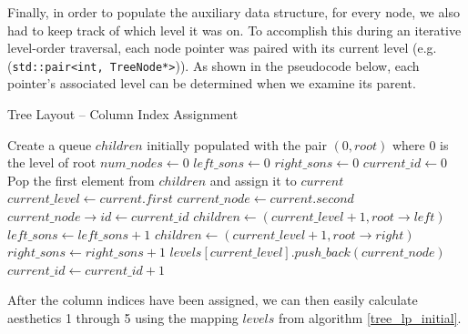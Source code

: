 \documentclass[11pt]{report}
\begin{document}
\bigskip

Finally, in order to populate the auxiliary data structure, for every node, we also had to keep track of which level it was on. To accomplish this during an iterative level-order traversal, each node pointer was paired with its current level (e.g. (\lstinline{std::pair<int, TreeNode*>})). As shown in the pseudocode below, each pointer's associated level can be determined when we examine its parent.

\begin{algorithm}[H]
    \caption{Tree Layout -- Column Index Assignment}
    \label{tree_lp_initial}
    \begin{algorithmic}[1]
        \State Create a queue $children$ initially populated with the pair $(0, root)$ where 0 is the level of root
        \State $num\_nodes \gets 0$ 
        \State $left\_sons \gets 0$
        \State $right\_sons \gets 0$
        \State $current\_id \gets 0$ 
         
        \State Pop the first element from $children$ and assign it to $current$
        \State $current\_level \gets current.first$
        \State $current\_node \gets current.second$
        \State $current\_node\rightarrow id \gets current\_id$
            \State $children \gets (current\_level + 1, root\rightarrow left)$ 
            \State $left\_sons \gets left\_sons + 1$ 
            \EndIf
            \State $children \gets (current\_level + 1, root\rightarrow right)$ 
            \State $right\_sons \gets right\_sons + 1$ 
            \EndIf
        \State $levels[current\_level].push\_back(current\_node)$
        \State $current\_id \gets current\_id + 1$
        \EndWhile
        \EndProcedure
    \end{algorithmic}
\end{algorithm}

After the column indices have been assigned, we can then easily calculate aesthetics 1 through 5 using the mapping $levels$ from algorithm \ref{tree_lp_initial}.
\end{document}
